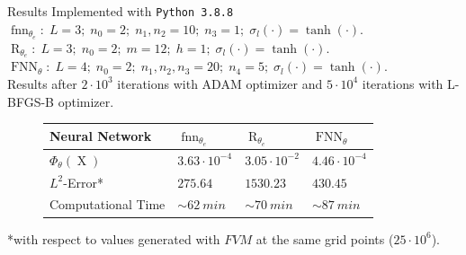 \documentclass[9pt]{beamer}
\begin{document}
\begin{frame}{Results}
    Implemented with \lstinline!Python 3.8.8! \\
    \vspace{5mm}
    $\operatorname{fnn}_{\theta_e} \colon \; L = 3; \; n_0 = 2; \; n_1, n_2 = 10; \; n_3 = 1; \; \sigma_l\left( \cdot \right) = \tanh \left( \cdot \right)$. \\ 
    $\operatorname{R}_{\theta_e} \colon \; L = 3; \; n_0 = 2; \; m = 12; \; h = 1; \; \sigma_l\left( \cdot \right) = \tanh \left( \cdot \right)$. \\ 
    $\operatorname{FNN}_{\theta} \colon \; L = 4; \; n_0 = 2; \; n_1, n_2, n_3 = 20; \; n_4 = 5; \; \sigma_l\left( \cdot \right) = \tanh \left( \cdot \right)$. \\ 
    \vspace{5mm}
    Results after $2 \cdot 10^{3}$ iterations with ADAM optimizer and $5 \cdot 10^{4}$ iterations with L-BFGS-B optimizer. 
    \begin{figure}[H]
        \begin{center}
            \resizebox{!}{!}
            {
                \begin{tabular}{l l l l }
                    \toprule
                    Neural Network & $\operatorname{fnn}_{\theta_e}$ & $\operatorname{R}_{\theta_e}$ & $\operatorname{FNN}_{\theta}$  \\ 
                    \midrule
                    $\Phi_{\theta} \left( \operatorname{X} \right)$ & $3.63 \cdot 10^{-4}$ & $3.05 \cdot 10^{-2}$ & $4.46 \cdot 10^{-4}$  \\
                    \midrule
                    $L^2$-Error* & $275.64$ & $1530.23$ & $430.45$ \\ 
                    \midrule
                    Computational Time & $\sim 62 \ min$ & $\sim 70 \ min$ & $\sim 87 \ min$ \\ 
                    \bottomrule
                \end{tabular}
            }
        \end{center}
    \end{figure}
    *with respect to values generated with $FVM$ at the same grid points ($25 \cdot 10^{6}$).
\end{frame}
\end{document}
